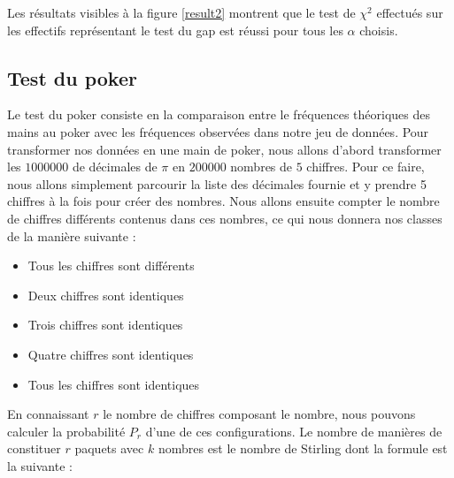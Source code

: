 \documentclass[10pt,a4paper]{article}
\begin{document}
Les résultats visibles à la figure \ref{result2} montrent que le test de $\chi^2$ effectués sur les effectifs représentant le test du gap est réussi pour tous les $\alpha$ choisis.

\subsection{Test du poker}
Le test du poker consiste en la comparaison entre le fréquences théoriques des mains au poker avec les
fréquences observées dans notre jeu de données. Pour transformer nos données en une main de poker, nous allons d'abord transformer les $1 000 000$ de décimales de $\pi$ en $200 000$ nombres de $5$ chiffres. Pour ce faire, nous allons simplement parcourir la liste des décimales fournie et y prendre 5 chiffres à la fois pour créer des nombres.\newline \newline
Nous allons ensuite compter le nombre de chiffres différents contenus dans ces nombres, ce qui nous donnera nos classes de la manière
suivante : \\
\begin{itemize}
\item Tous les chiffres sont différents
\item Deux chiffres sont identiques
\item Trois chiffres sont identiques
\item Quatre chiffres sont identiques
\item Tous les chiffres sont identiques
\end{itemize}
\bigskip
En connaissant $r$ le nombre de chiffres composant le nombre, nous pouvons calculer la probabilité $P_r$ d'une de ces configurations.
Le nombre de manières de constituer $r$ paquets avec $k$ nombres est le nombre de Stirling dont la formule est la suivante :
\end{document}
